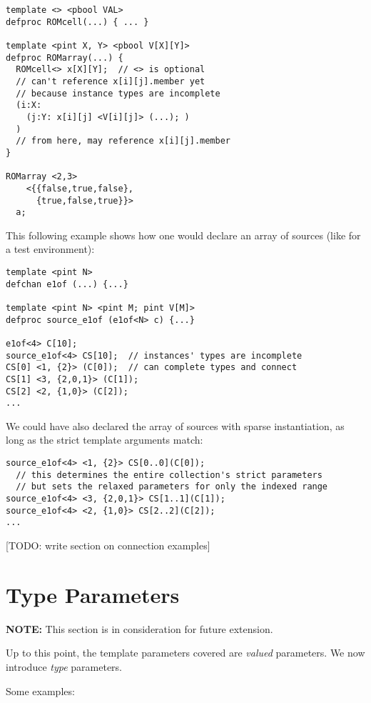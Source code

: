 \begin{verbatim}
template <> <pbool VAL>
defproc ROMcell(...) { ... }

template <pint X, Y> <pbool V[X][Y]>
defproc ROMarray(...) {
  ROMcell<> x[X][Y];  // <> is optional
  // can't reference x[i][j].member yet 
  // because instance types are incomplete
  (i:X:
    (j:Y: x[i][j] <V[i][j]> (...); )
  )
  // from here, may reference x[i][j].member
}

ROMarray <2,3>
    <{{false,true,false},
      {true,false,true}}>
  a;
\end{verbatim}

This following example shows how one would declare an array of sources
(like for a test environment):

\begin{verbatim}
template <pint N>
defchan e1of (...) {...}

template <pint N> <pint M; pint V[M]>
defproc source_e1of (e1of<N> c) {...}

e1of<4> C[10];
source_e1of<4> CS[10];  // instances' types are incomplete
CS[0] <1, {2}> (C[0]);  // can complete types and connect
CS[1] <3, {2,0,1}> (C[1]);
CS[2] <2, {1,0}> (C[2]);
...
\end{verbatim}

We could have also declared the array of sources with sparse instantiation, 
as long as the strict template arguments match:
\begin{verbatim}
source_e1of<4> <1, {2}> CS[0..0](C[0]);
  // this determines the entire collection's strict parameters
  // but sets the relaxed parameters for only the indexed range
source_e1of<4> <3, {2,0,1}> CS[1..1](C[1]);
source_e1of<4> <2, {1,0}> CS[2..2](C[2]);
...
\end{verbatim}

[TODO: write section on connection examples]

\section{Type Parameters}
\label{sec:templates:typeparam}

\textbf{NOTE:} This section is in consideration for future extension.  

Up to this point, the template parameters covered are 
\emph{valued} parameters.  
We now introduce \emph{type} parameters.  

Some examples:

